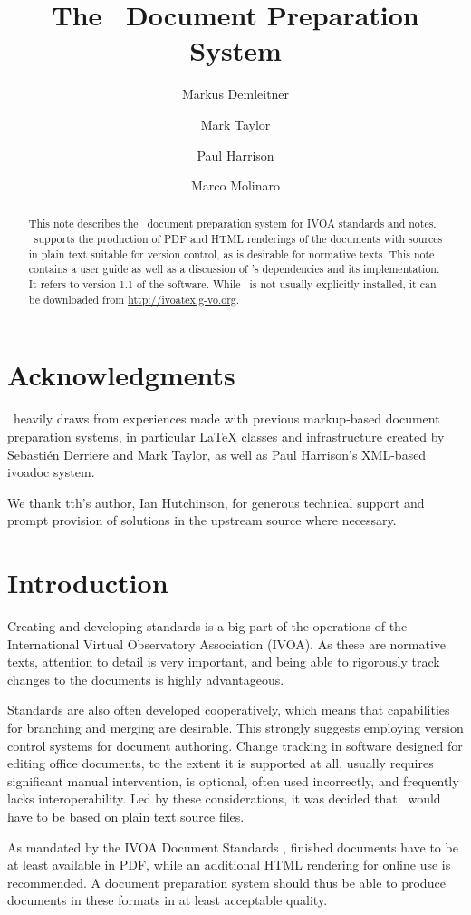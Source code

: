 \documentclass[11pt,a4paper]{ivoa}
\title{The \ivoatex\ Document Preparation System}
\author[http://www.ivoa.net/cgi-bin/twiki/bin/view/IVOA/MarkusDemleitner]{Markus Demleitner}
\author[http://www.ivoa.net/cgi-bin/twiki/bin/view/IVOA/MarkTaylor]{Mark Taylor}
\author[http://www.ivoa.net/cgi-bin/twiki/bin/view/IVOA/PaulHarrison]{Paul Harrison}
\author[http://www.ivoa.net/cgi-bin/twiki/bin/view/IVOA/MarcoMolinaro]{Marco Molinaro}
\begin{document}
\begin{abstract}
This note describes the \ivoatex\ document preparation system for IVOA
standards and notes.  \ivoatex\ supports the production of
PDF and HTML renderings of the documents with sources in
plain text suitable for version control, as is desirable for normative
texts.  This note contains a user guide as well as a discussion of 
\ivoatex's dependencies and its implementation.  It refers to version
1.1 of the software.  While \ivoatex~is not usually explicitly
installed, it can be downloaded from \url{http://ivoatex.g-vo.org}.
\end{abstract}


\section*{Acknowledgments}

\ivoatex\ heavily draws from experiences made with previous markup-based
document preparation systems, in particular LaTeX classes and
infrastructure created by Sebasti\'en Derriere and Mark Taylor, as well
as Paul Harrison's XML-based ivoadoc system.

We thank tth's author, Ian Hutchinson, for generous technical support
and prompt provision of solutions in the upstream source where necessary.

\section{Introduction}

Creating and developing standards is a  big part of the operations of
the International Virtual Observatory Association (IVOA).
As these are normative texts, attention to detail is very important, and
being able to rigorously track changes to the documents is highly
advantageous.  

Standards are also often developed cooperatively, which means that
capabilities for branching and merging are desirable.  This strongly
suggests employing version control systems for document authoring.
Change tracking in software designed for editing office documents, to
the extent it is supported at all, usually requires significant
manual intervention, is optional, often used incorrectly, and frequently
lacks interoperability.  Led by these considerations, it was decided that
\ivoatex\ would have to be based on plain text source files.

As mandated by the IVOA Document Standards \citep{2017ivoa.spec.0517G},
finished documents have to be at
least available in PDF, while an additional HTML rendering for online
use is recommended.  A document preparation system should thus be
able  to produce documents in these formats in at least acceptable
quality.
\end{document}
